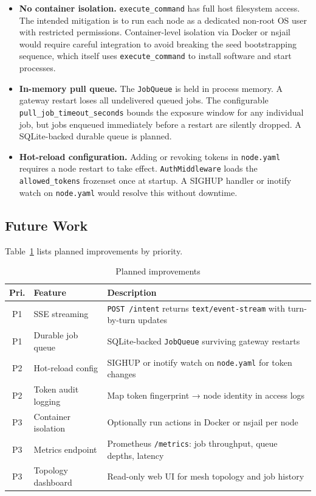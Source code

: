 \documentclass[10pt,twocolumn]{article}
\begin{document}
\begin{itemize}[noitemsep, leftmargin=12pt]
  \item \textbf{No container isolation.} \texttt{execute\_command} has
    full host filesystem access. The intended mitigation is to run each
    node as a dedicated non-root OS user with restricted permissions.
    Container-level isolation via Docker or nsjail would require
    careful integration to avoid breaking the seed bootstrapping
    sequence, which itself uses \texttt{execute\_command} to install
    software and start processes.

  \item \textbf{In-memory pull queue.} The \texttt{JobQueue} is held
    in process memory. A gateway restart loses all undelivered queued
    jobs. The configurable \texttt{pull\_job\_timeout\_seconds} bounds
    the exposure window for any individual job, but jobs enqueued
    immediately before a restart are silently dropped. A SQLite-backed
    durable queue is planned.

  \item \textbf{Hot-reload configuration.} Adding or revoking tokens
    in \texttt{node.yaml} requires a node restart to take effect.
    \texttt{AuthMiddleware} loads the \texttt{allowed\_tokens}
    frozenset once at startup. A SIGHUP handler or inotify watch on
    \texttt{node.yaml} would resolve this without downtime.
\end{itemize}

\subsection{Future Work}

Table~\ref{tab:futurework} lists planned improvements by priority.

\begin{table}[h]
\centering
\caption{Planned improvements}
\label{tab:futurework}
\small
\begin{tabular}{@{}clp{4.2cm}@{}}
\toprule
\textbf{Pri.} & \textbf{Feature} & \textbf{Description} \\
\midrule
P1 & SSE streaming & \texttt{POST /intent} returns \texttt{text/event-stream} with turn-by-turn updates \\
P1 & Durable job queue & SQLite-backed \texttt{JobQueue} surviving gateway restarts \\
P2 & Hot-reload config & SIGHUP or inotify watch on \texttt{node.yaml} for token changes \\
P2 & Token audit logging & Map token fingerprint → node identity in access logs \\
P3 & Container isolation & Optionally run actions in Docker or nsjail per node \\
P3 & Metrics endpoint & Prometheus \texttt{/metrics}: job throughput, queue depths, latency \\
P3 & Topology dashboard & Read-only web UI for mesh topology and job history \\
\bottomrule
\end{tabular}
\end{table}
\end{document}
